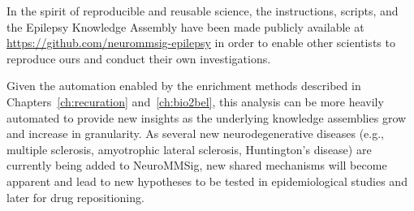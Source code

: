 In the spirit of reproducible and reusable science, the instructions, scripts, and the Epilepsy Knowledge Assembly have been made publicly available at \url{https://github.com/neurommsig-epilepsy} in order to enable other scientists to reproduce ours and conduct their own investigations.

Given the automation enabled by the enrichment methods described in Chapters~\ref{ch:recuration} and~\ref{ch:bio2bel}, this analysis can be more heavily automated to provide new insights as the underlying knowledge assemblies grow and increase in granularity.
As several new neurodegenerative diseases (e.g., multiple sclerosis, amyotrophic lateral sclerosis, Huntington's disease) are currently being added to NeuroMMSig, new shared mechanisms will become apparent and lead to new hypotheses to be tested in epidemiological studies and later for drug repositioning.
